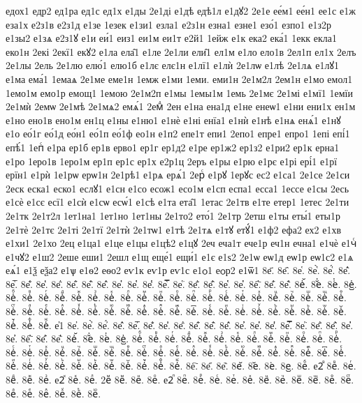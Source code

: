 {едох1
едр2
ед1ра
ед1с
ед1х
е1ды
2е1ді
е1дѣ
едѣ1л
е1дꙋ2
2е1е
ее́м1
ее́н1
ее1с
е1ж
еза1х
е2з1в
е2з1д
е1зе
1езек
е1зи1
езла1
е2з1н
езна1
езне1
езо́1
езпо1
е1з2р
е1зы2
е1зѧ
е2з1ꙋ
е1и
еи́1
еиз1
еи1м
еи1т
е2й1
1ейж
е1к
ека2
ека́1
1екк
екла1
еко1н
2екі
2екї1
екꙋ2
е1ла
ела̑1
е1ле
2е1ли
ели̑1
ел1м
е1ло
ело1в
2ел1п
ел1х
2елъ
2е1лы
2ель
2е1лю
елю́1
елю1б
е1лє
елє1н
е1лї1
е1лѝ
2е1лѡ
е1лѣ
2е1лѧ
е1лꙋ1
е1ма
ема́1
1емаѧ
2е1ме
еме1н
1емж
е1ми
1еми.
еми1н
2е1м2л
2ем1н
е1мо
емол1
1емо1м
емо1р
емощ1
1емою
2е1м2п
е1мы
1емы1м
1емь
2е1мє
2е1мі
е1мї1
1емїи
2е1мѝ
2емѡ
2е1мѣ
2е1мѧ2
емѧ́1
2емⷣ
2ен
е1на
ена1д
е1не
енеѡ1
е1ни
ени1х
ен1м
е1но
ено1в
ено1м
ен1ц
е1ны
е1ню1
е1нѐ
е1ні
енїа1
е1нѝ
е1нѣ
е1нѧ
енѧ́1
е1нꙋ
е1о
ео́1г
ео́1д
ео́н1
ео́1п
ео́1ф
ео1н
е1п2
епе1т
епи1
2епо1
епре1
епро1
1епі
епі́1
епѣ́1
1епⷭ
е1ра
ер1б
ер1в
ерво1
ер1г
ер1д2
е1ре
ер1ж2
ер1з2
е1ри2
ер1к
ерна1
е1ро
1еро1в
1еро1м
ер1п
ер1с
ер1х
е2р1ц
2еръ
е1ры
е1рю
е1рє
е1рі
ері́1
е1рї
ерїн1
е1рѝ
1е1рѡ
ерѡ1н
2е1рѣ1
е1рѧ
ерѧ́1
2ерⷭ
е1рꙋ
1ерꙋс
ес2
е1са1
2е1се
2е1си
2еск
еска1
еско1
еслꙋ1
е1сн
е1со
есож1
есо1м
е1сп
еспа1
есса1
1ессе
е1сы
2есь
е1сѐ
е1сє
есї1
е1сѝ
е1сѡ
есѡ́1
е1сѣ
е1та
ета̑1
1етас
2е1тв
е1те
етер1
1етес
2е1ти
2е1тк
2е1т2л
1ет1на1
1ет1но
1ет1ны
2е1то2
ето́1
2е1тр
2етш
е1ты
еты́1
еты1р
2е1тѐ
2е1тє
2е1ті
2е1тї
2е1тѝ
2е1тѡ1
е1тѣ
2е1тѧ
е1тꙋ
етꙋ́1
е1ф2
ефа2
ех2
е1хв
е1хи1
2е1хо
2ец
е1ца1
е1це
е1цы
е1цѣ2
е1цꙋ
2еч
еча1т
ече1р
еч1н
ечна1
е1чѐ
е1чⷭ
е1чꙋ2
е1ш2
2еше
еши1
2ешл
е1щ
еще́1
ещи́1
е1є
е1ѕ2
2е1ѡ
еѡ1д
еѡ1р
еѡ1с2
е1ѧ
еѧ́1
е1ѯ
еѯа2
е1ѱ
е1ѳ2
еѳо2
еѵ1к
еѵ1р
еѵ1с
е1ѻ1
еѻр2
е1ѿ1
8е҃.
8е҄.
8е҅.
8е҅̀.
8е҅́.
8е҅̂.
8е҅̅.
8е҅̆.
8е҅̇.
8е҅̈.
8е҅̋.
8е҅̏.
8е҅̑.
8е҅̓.
8е҅̔.
8е҅̾.
8е҅̿.
8е҅͘.
8е҅҃.
8е҅҄.
8е҅҅.
8е҅҆.
8е҅҇.
8е҅᷀.
8е҅᷁.
8е҅᷶.
8е᷷҅.
8е᷸҅.
8е᷹҅.
8е҅ⷠ.
8е҅ⷡ.
8е҅ⷢ.
8е҅ⷣ.
8е҅ⷤ.
8е҅ⷥ.
8е҅ⷦ.
8е҅ⷧ.
8е҅ⷨ.
8е҅ⷩ.
8е҅ⷪ.
8е҅ⷫ.
8е҅ⷬ.
8е҅ⷭ.
8е҅ⷮ.
8е҅ⷯ.
8е҅ⷰ.
8е҅ⷱ.
8е҅ⷲ.
8е҅ⷳ.
8е҅ⷴ.
8е҅ⷵ.
8е҅ⷶ.
8е҅ⷷ.
8е҅ⷸ.
8е҅ⷹ.
8е҅ⷺ.
8е҅ⷻ.
8е҅ⷼ.
8е҅ⷽ.
8е҅ⷾ.
8е҅ⷿ.
8е҅꙯.
8е҅ꙴ.
8е҅ꙵ.
8е҅ꙶ.
8е҅ꙷ.
8е҅ꙸ.
8е҅ꙹ.
8е҅ꙺ.
8е҅ꙻ.
8е҅꙼.
8е҅꙽.
8е҅ꚞ.
8е҅ꚟ.
е҆1
8е҆.
8е҆̀.
8е҆́.
8е҆̂.
8е҆̅.
8е҆̆.
8е҆̇.
8е҆̈.
8е҆̋.
8е҆̏.
8е҆̑.
8е҆̓.
8е҆̔.
8е҆̾.
8е҆̿.
8е҆͘.
8е҆҃.
8е҆҄.
8е҆҅.
8е҆҆.
8е҆҇.
8е҆᷀.
8е҆᷁.
8е҆᷶.
8е᷷҆.
8е᷸҆.
8е᷹҆.
8е҆ⷠ.
8е҆ⷡ.
8е҆ⷢ.
8е҆ⷣ.
8е҆ⷤ.
8е҆ⷥ.
8е҆ⷦ.
8е҆ⷧ.
8е҆ⷨ.
8е҆ⷩ.
8е҆ⷪ.
8е҆ⷫ.
8е҆ⷬ.
8е҆ⷭ.
8е҆ⷮ.
8е҆ⷯ.
8е҆ⷰ.
8е҆ⷱ.
8е҆ⷲ.
8е҆ⷳ.
8е҆ⷴ.
8е҆ⷵ.
8е҆ⷶ.
8е҆ⷷ.
8е҆ⷸ.
8е҆ⷹ.
8е҆ⷺ.
8е҆ⷻ.
8е҆ⷼ.
8е҆ⷽ.
8е҆ⷾ.
8е҆ⷿ.
8е҆꙯.
8е҆ꙴ.
8е҆ꙵ.
8е҆ꙶ.
8е҆ꙷ.
8е҆ꙸ.
8е҆ꙹ.
8е҆ꙺ.
8е҆ꙻ.
8е҆꙼.
8е҆꙽.
8е҆ꚞ.
8е҆ꚟ.
8е҇.
8е᷀.
8е᷁.
8е᷶.
8е᷷.
8е᷸.
8е᷹.
8еⷠ.
е2ⷡ
8еⷡ.
8еⷢ.
8еⷣ.
8еⷤ.
8еⷥ.
е2ⷦ
8еⷦ.
8еⷧ.
2еⷨ
8еⷨ.
8еⷩ.
8еⷪ.
е2ⷫ
8еⷫ.
8еⷬ.
8еⷭ.
8еⷮ.
8еⷯ.
8еⷰ.
8еⷱ.
8еⷲ.
8еⷳ.
8еⷴ.
8еⷵ.
8еⷶ.
8еⷷ.
8еⷸ.
8еⷹ.
8еⷺ.
8еⷻ.
}

